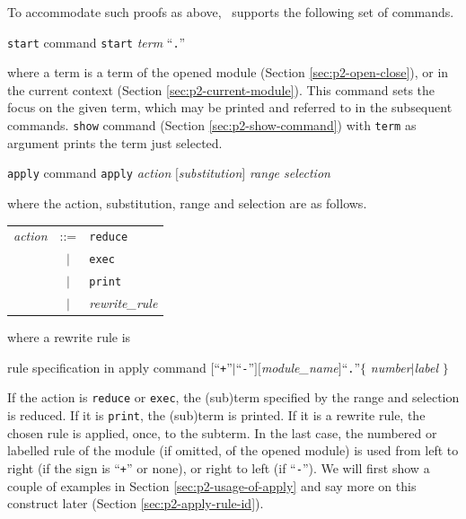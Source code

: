 \documentclass[a4paper]{memoir}
\begin{document}
To accommodate such proofs as above, \cafeobj~supports the
following set of commands.

\begin{bsyntax} \texttt{start} command  \Hline
\texttt{start} \textit{term} ``\texttt{.}''
\end{bsyntax}

where a term is a term of the opened module
(Section \ref{sec:p2-open-close}), or in the current context
(Section \ref{sec:p2-current-module}).
This command sets the focus on the given term, which may be printed and
referred to in the subsequent commands. \verb|show| command
(Section \ref{sec:p2-show-command}) with \verb|term| as argument prints
the term just selected.

\begin{bsyntax} \texttt{apply} command  \Hline
\texttt{apply} \textit{action} $[$\textit{substitution}$]$ \textit{range selection}
\end{bsyntax}

where the action, substitution, range and selection are as follows.

\begin{tabular}{r c l}
  \textit{action} &::=& \verb|reduce| \\
     &$|$& \verb|exec| \\
     &$|$& \verb|print| \\
     &$|$& \textit{rewrite\_rule} \\
\end{tabular}

where a rewrite rule is

\begin{bsyntax} rule specification in \texttt{}apply\textit{} command \Hline
$[$``\texttt{+}''$|$``\texttt{-}''$]$$[$\textit{module\_name}$]$``\texttt{.}''$\{$ \textit{number}$|$\textit{label} $\}$
\end{bsyntax}

If the action is \texttt{reduce} or \texttt{exec},
the (sub)term specified by the range and
selection is reduced. If it is \texttt{print}, the (sub)term is printed.
If it is a rewrite rule, the chosen rule is applied, once, to the
subterm. In the last case, the numbered or labelled rule of the
module (if omitted, of the opened module) is used from left to right
(if the sign is ``\verb|+|'' or none), or right to left (if ``\verb|-|'').
We will first show a couple of examples in 
Section \ref{sec:p2-usage-of-apply} and
say more on this construct later (Section \ref{sec:p2-apply-rule-id}).
\end{document}
